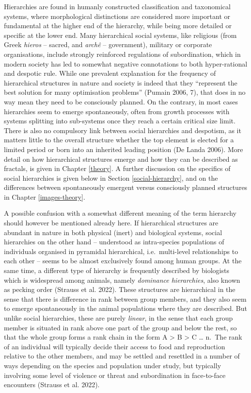 \documentclass[
  12pt,
  a4paper, twoside]{book}
\begin{document}
Hierarchies are found in humanly constructed classification and taxonomical systems, where morphological distinctions are considered more important or fundamental at the higher end of the hierarchy, while being more detailed or specific at the lower end. Many hierarchical social systems, like religious (from Greek \emph{hieros} -- sacred, and \emph{archê} -- government), military or corporate organisations, include strongly reinforced regulations of subordination, which in modern society has led to somewhat negative connotations to both hyper-rational and despotic rule. While one prevalent explanation for the frequency of hierarchical structures in nature and society is indeed that they ``represent the best solution for many optimisation problems'' (Pumain 2006, 7), that does in no way mean they need to be consciously planned. On the contrary, in most cases hierarchies seem to emerge spontaneously, often from growth processes with systems splitting into sub-systems once they reach a certain critical size limit. There is also no compulsory link between social hierarchies and despotism, as it matters little to the overall structure whether the top element is elected for a limited period or born into an inherited leading position (De Landa 2006). More detail on how hierarchical structures emerge and how they can be described as fractals, is given in Chapter \ref{theory}. A further discussion on the specifics of social hierarchies is given below in Section \ref{social-hierarchy}, and on the differences between spontaneously emergent versus consciously planned structures in Chapter \ref{images-theory}.

A possible confusion with a somewhat different meaning of the term hierarchy should however be mentioned already here. If hierarchical structures are abundant in nature in both physical (inert) and biological systems, social hierarchies on the other hand -- understood as intra-species populations of individuals organised in pyramidal hierarchical, i.e.~multi-level relationships to each other -- seems to be almost exclusively found among human groups. At the same time, a different type of hierarchy is frequently described by biologists which is widespread among animals, namely \emph{dominance hierarchies}, also known as pecking order (Strauss et al. 2022). These structures are hierarchical in the sense that there is difference in rank between group members, and they also seem to emerge spontaneously in the animal populations where they are described. But unlike social hierarchies, these are purely \emph{linear}, in the sense that each group member is situated in rank above one part of the group and below the rest, so that the whole group forms a rank chain in the form A \textgreater{} B \textgreater{} C \ldots{} n.~The rank of an individual will typically decide their access to food and reproduction relative to the other members, and may be settled and resettled in a number of ways depending on the species and population under study, but typically involving some level of violence or threat and subordination in face-to-face encounters (Strauss et al. 2022).
\end{document}
